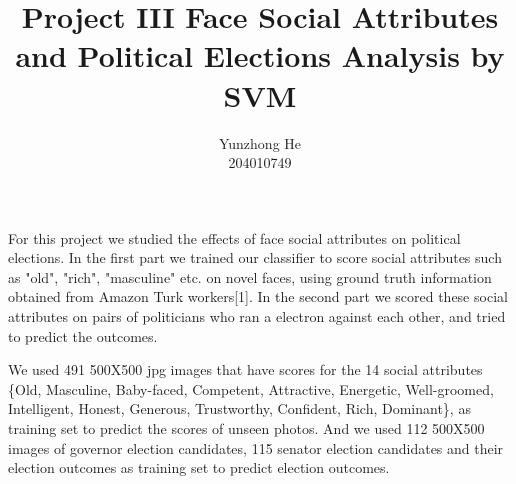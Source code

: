 \documentclass[12pt]{article}
\newenvironment{intro}[2][I Introduction]{\begin{trivlist}
\item[\hskip \labelsep {\bfseries #1}\hskip \labelsep {\bfseries #2}]}{\end{trivlist}}
\newenvironment{p1}[2][II Dataset]{\begin{trivlist}
\item[\hskip \labelsep {\bfseries #1}\hskip \labelsep {\bfseries #2}]}{\end{trivlist}}
\newenvironment{p2}[2][III Feature Designs]{\begin{trivlist}
\item[\hskip \labelsep {\bfseries #1}\hskip \labelsep {\bfseries #2}]}{\end{trivlist}}
\begin{document}
 
 
\title{Project III Face Social Attributes and Political Elections Analysis by SVM}
\author{Yunzhong He\\ %
204010749} %
 
\maketitle

\begin{intro}{}
\item{}
For this project we studied the effects of face social attributes on political elections. In the first part we trained our classifier to score social attributes such as "old", "rich", "masculine" etc. on novel faces, using ground truth information obtained from Amazon Turk workers[1]. In the second part we scored these social attributes on pairs of politicians who ran a electron against each other, and tried to predict the outcomes.
\end{intro}

\begin{p1}{}
\item{}
We used 491 500X500 jpg images that have scores for the 14 social attributes \{Old, Masculine, Baby-faced, Competent, Attractive, Energetic, Well-groomed, Intelligent, Honest, Generous, Trustworthy, Confident, Rich, Dominant\}, as training set to predict the scores of unseen photos. And we used 112 500X500 images of governor election candidates, 115 senator election candidates and their election outcomes as training set to predict election outcomes.
\end{p1}

\begin{p2}{}

\item{}
\end{p2}


 
\end{document}
